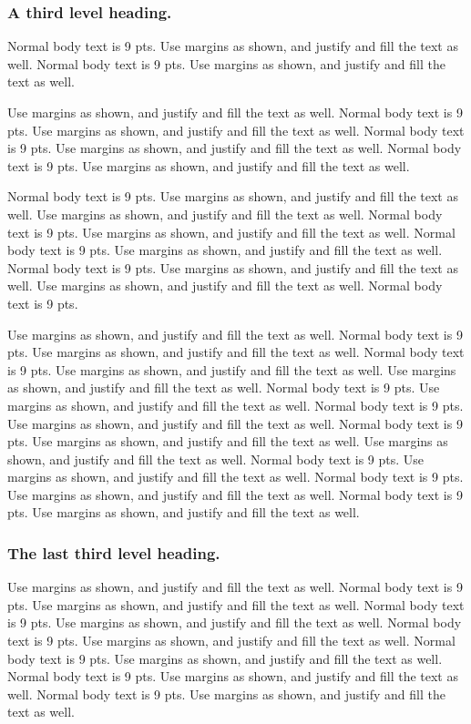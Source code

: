 \subsubsection{A third level heading.}
Normal body text is 9 pts. Use margins as shown, and justify and fill the text as well.   Normal body text is 9 pts. Use margins as shown, and justify and fill the text as well.


Use margins as shown, and justify and fill the text as well.   Normal body text is 9 pts. Use margins as shown, and justify and fill the text as well.   Normal body text is 9 pts. Use margins as shown, and justify and fill the text as well.   Normal body text is 9 pts. Use margins as shown, and justify and fill the text as well.   

  Normal body text is 9 pts. Use margins as shown, and justify and fill the text as well.   
Use margins as shown, and justify and fill the text as well.   Normal body text is 9 pts. Use margins as shown, and justify and fill the text as well.   Normal body text is 9 pts. Use margins as shown, and justify and fill the text as well.   Normal body text is 9 pts. Use margins as shown, and justify and fill the text as well.   
Use margins as shown, and justify and fill the text as well.   Normal body text is 9 pts.

 Use margins as shown, and justify and fill the text as well.   Normal body text is 9 pts. Use margins as shown, and justify and fill the text as well.   Normal body text is 9 pts. Use margins as shown, and justify and fill the text as well.   
Use margins as shown, and justify and fill the text as well.   Normal body text is 9 pts. Use margins as shown, and justify and fill the text as well.   Normal body text is 9 pts. Use margins as shown, and justify and fill the text as well.   Normal body text is 9 pts. Use margins as shown, and justify and fill the text as well.   
Use margins as shown, and justify and fill the text as well.   Normal body text is 9 pts. Use margins as shown, and justify and fill the text as well.   Normal body text is 9 pts. Use margins as shown, and justify and fill the text as well.   Normal body text is 9 pts. Use margins as shown, and justify and fill the text as well.   

\subsubsection{The last third level heading.} Use margins as shown, and justify and fill the text as well.   Normal body text is 9 pts. Use margins as shown, and justify and fill the text as well.   Normal body text is 9 pts. Use margins as shown, and justify and fill the text as well.   Normal body text is 9 pts. Use margins as shown, and justify and fill the text as well. Normal body text is 9 pts. Use margins as shown, and justify and fill the text as well.   Normal body text is 9 pts. Use margins as shown, and justify and fill the text as well.   Normal body text is 9 pts. Use margins as shown, and justify and fill the text as well.   

